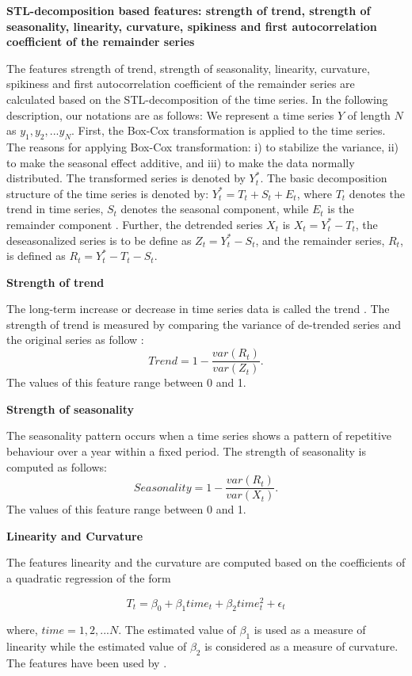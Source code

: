 \documentclass[11pt,a4paper,]{article}
\theoremstyle{definition}
\theoremstyle{definition}
\theoremstyle{definition}
\theoremstyle{remark}
\begin{document}
\textbf{STL-decomposition based features: strength of trend, strength of
seasonality, linearity, curvature, spikiness and first autocorrelation
coefficient of the remainder series}

The features strength of trend, strength of seasonality, linearity,
curvature, spikiness and first autocorrelation coefficient of the
remainder series are calculated based on the STL-decomposition of the
time series. In the following description, our notations are as follows:
We represent a time series \(Y\) of length \(N\) as
\(y_1, y_2, ...y_N\). First, the Box-Cox transformation is applied to
the time series. The reasons for applying Box-Cox transformation: i) to
stabilize the variance, ii) to make the seasonal effect additive, and
iii) to make the data normally distributed. The transformed series is
denoted by \(Y_{t}^*\). The basic decomposition structure of the time
series is denoted by: \(Y_t^*=T_t+S_t+E_t\), where \(T_t\) denotes the
trend in time series, \(S_t\) denotes the seasonal component, while
\(E_t\) is the remainder component \autocite{cleveland1990stl}. Further,
the detrended series \(X_t\) is \(X_t=Y_t^*-T_t\), the deseasonalized
series is to be define as \(Z_t=Y_t^*-S_t\), and the remainder series,
\(R_t\), is defined as \(R_t=Y_t^*-T_t-S_t\).

\textbf{Strength of trend}

The long-term increase or decrease in time series data is called the
trend \autocite{hyndman2014forecasting}. The strength of trend is
measured by comparing the variance of de-trended series and the original
series as follow \autocite{wang2009rule}: \[
    Trend =1- \frac{var(R_{t})}{var(Z_{t})}.
\] The values of this feature range between 0 and 1.

\textbf{Strength of seasonality}

The seasonality pattern occurs when a time series shows a pattern of
repetitive behaviour over a year within a fixed period. The strength of
seasonality is computed as follows\autocite{wang2009rule}: \[
    Seasonality =1- \frac{var(R_{t})}{var(X_{t})}.
\]The values of this feature range between 0 and 1.

\textbf{Linearity and Curvature}

The features linearity and the curvature are computed based on the
coefficients of a quadratic regression of the form

\[T_t=\beta_0+\beta_1time_t+\beta_2time_t^2+\epsilon_t\]

where, \(time=1, 2, ...N\). The estimated value of \(\beta_1\) is used
as a measure of linearity while the estimated value of \(\beta_2\) is
considered as a measure of curvature. The features have been used by
\textcite{hyndman2015large}.
\end{document}
